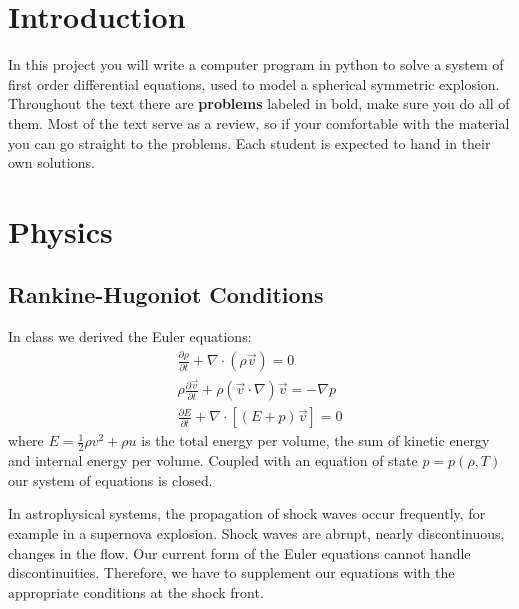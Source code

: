 \documentclass{article}
\begin{document}

\section{Introduction}
In this project you will write a computer program in python to solve a system of first order differential equations, used to model a spherical symmetric explosion. Throughout the text there are \textbf{problems} labeled in bold, make sure you do all of them. Most of the text serve as  a review, so if your comfortable with the material you can go straight to the problems. Each student is expected to hand in their own solutions.

\section{Physics}
\subsection{Rankine-Hugoniot Conditions}
In class we derived the Euler equations:
\begin{gather}
\label{eq: continuity equation}
\frac{\partial\rho}{\partial t} +\nabla\cdot(\rho\vec{v})=0 \\
\label{eq: momentum equation}
\rho\frac{\partial\vec{v}}{\partial t}+\rho(\vec{v}\cdot\nabla)\vec{v}=-\nabla p \\
\label{eq: energy equation}
\frac{\partial E}{\partial t} + \nabla\cdot \left[ \left( E+p\right) \vec{v}\right]  = 0
\end{gather}
where $E=\frac{1}{2}\rho v^{2} + \rho u$ is the total energy per volume, the sum of kinetic energy and internal energy per volume. Coupled with an equation of state $p = p\left(\rho, T\right)$ our system of equations is closed.

In astrophysical systems, the propagation of shock waves occur frequently, for example in a supernova explosion. Shock waves are abrupt, nearly  discontinuous, changes in the flow. Our current form of the Euler equations cannot handle discontinuities. Therefore, we have to supplement our equations with the appropriate conditions at the shock front. 
\end{document}
